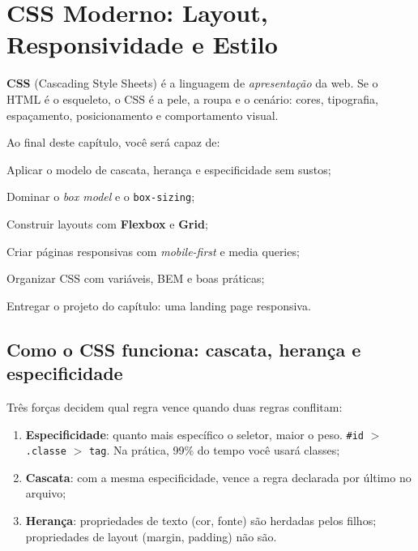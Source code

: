 \chapter{CSS Moderno: Layout, Responsividade e Estilo}
\label{cap:css}

\begin{caixaconceito}
\textbf{CSS} (Cascading Style Sheets) é a linguagem de \emph{apresentação} da
web. Se o HTML é o esqueleto, o CSS é a pele, a roupa e o cenário: cores,
tipografia, espaçamento, posicionamento e comportamento visual.
\end{caixaconceito}

Ao final deste capítulo, você será capaz de:
\begin{objetivos}
  \item Aplicar o modelo de cascata, herança e especificidade sem sustos;
  \item Dominar o \emph{box model} e o \texttt{box-sizing};
  \item Construir layouts com \textbf{Flexbox} e \textbf{Grid};
  \item Criar páginas responsivas com \emph{mobile-first} e media queries;
  \item Organizar CSS com variáveis, BEM e boas práticas;
  \item Entregar o projeto do capítulo: uma landing page responsiva.
\end{objetivos}

\section{Como o CSS funciona: cascata, herança e especificidade}

Três forças decidem qual regra vence quando duas regras conflitam:

\begin{enumerate}[leftmargin=*, itemsep=0.4em]
  \item \textbf{Especificidade}: quanto mais específico o seletor, maior o peso.
  \texttt{\#id} $>$ \texttt{.classe} $>$ \texttt{tag}. Na prática, 99\% do tempo
  você usará classes;
  \item \textbf{Cascata}: com a mesma especificidade, vence a regra declarada
  por último no arquivo;
  \item \textbf{Herança}: propriedades de texto (cor, fonte) são herdadas pelos
  filhos; propriedades de layout (margin, padding) não são.
\end{enumerate}

